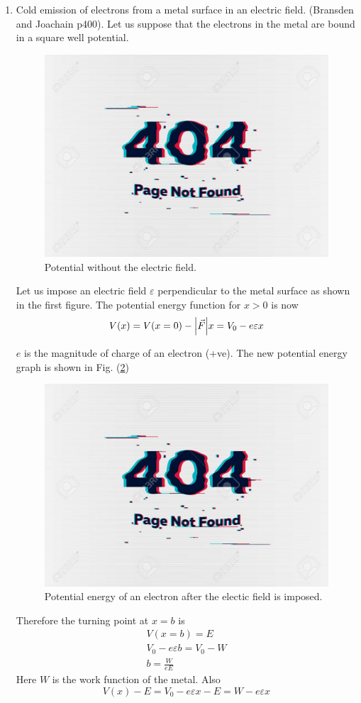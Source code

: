 \begin{enumerate}
	
	
	\item Cold emission of electrons from a metal surface in an electric field. (Bransden and Joachain p400).
	Let us suppose that the electrons in the metal are bound in a square well potential.
	\begin{figure}
		\centering
		\includegraphics[width=0.5\linewidth]{Pictures/not-found.jpg}
		\caption{Potential without the electric field.}
		\label{chapter22.fig9}
	\end{figure}
	Let us impose an electric field $\varepsilon$ perpendicular to the metal surface as shown in the first figure. The potential energy function for $x>0$ is now
	\begin{equation}
		V(x) = V(x=0) - \abs{\vec{F}} x = V_0 - e \varepsilon x
	\end{equation}

	$e$ is the magnitude of charge of an electron (+ve). The new potential energy graph is shown in Fig. (\ref{chapter22.fig10})
	
	\begin{figure}
		\centering
		\includegraphics[width=0.5\linewidth]{Pictures/not-found.jpg}
		\caption{Potential energy of an electron after the electic field is imposed.}
		\label{chapter22.fig10}
	\end{figure}
	Therefore the turning point at $x=b$ is
	\begin{align}
	V(x=b) = E \\
	V_0 - e \varepsilon b = V_0 - W\\
	b = \frac{W}{e E}
	\end{align}
	Here $W$ is the work function of the metal. Also
	\begin{equation}
		V(x) - E = V_0 - e \varepsilon x - E = W - e \varepsilon x
	\end{equation}


\end{enumerate}
